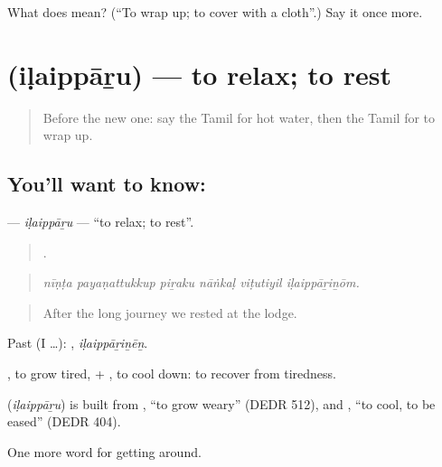 \begin{tcolorbox}[breakable,colback=teal!4,colframe=teal!35!black,title={Before you move on}]
What does  mean? (\textquotedblleft{}To wrap up; to cover with a cloth\textquotedblright{}.) Say it once more.
\end{tcolorbox}
\section[\texorpdfstring{\ta{இளைப்பாறு} (iḷaippāṟu)}{இளைப்பாறு (iḷaippāṟu)}]{ (iḷaippāṟu) — to relax; to rest}

\label{lesson:TA-C419-ilaipparu}



\begin{quote}
Before the new one: say the Tamil for hot water, then the Tamil for to wrap up.
\end{quote}

\subsection*{You'll want to know: }
\textbf{} — \emph{iḷaippāṟu} — \textquotedblleft{}to relax; to rest\textquotedblright{}.

\begin{quote}
     .
\end{quote}

\begin{quote}
\emph{nīṇṭa payaṇattukkup piṟaku nāṅkaḷ viṭutiyil iḷaippāṟiṉōm.}
\end{quote}

\begin{quote}
After the long journey we rested at the lodge.
\end{quote}

Past (I …): , \emph{iḷaippāṟiṉēṉ}.

, to grow tired, + , to cool down: to recover from tiredness.

\begin{cousinweb}
\textbf{} (\emph{iḷaippāṟu}) is built from , \textquotedblleft{}to grow weary\textquotedblright{} (DEDR 512), and , \textquotedblleft{}to cool, to be eased\textquotedblright{} (DEDR 404).
\end{cousinweb}

\begin{grammarlens}[title={What you've built}]
One more word for getting around.
\end{grammarlens}

